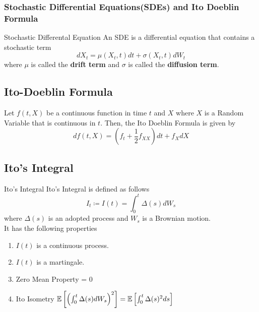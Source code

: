 \begin{frame}
	\frametitle{Stochastic Differential Equations(SDEs) and
	Ito Doeblin Formula}
	\begin{block}{Stochastic Differental Equation}
		An SDE is a differential equation that contains a stochastic term
		\[ dX_t = \mu(X_t, t)dt + \sigma(X_t, t)dW_t \]
		where \( \mu \) is called the \textbf{drift term} and
		\( \sigma \) is called the \textbf{diffusion term}.
	\end{block}

	\subsection{Ito-Doeblin Formula}
	\begin{theorem} \label{thm:ito-doeblin-formula}
		Let \( f(t, X) \) be a continuous function in time \( t \) and \( X \)
		where \( X \) is a Random Variable that is continuous in \( t \).
		Then, the Ito Doeblin Formula is given by
		\[ df(t, X) = \left( f_t + \frac{1}{2}f_{XX} \right) dt + f_{X} dX \]
	\end{theorem}
\end{frame}

\subsection{Ito's Integral}
\begin{frame}{Ito's Integral}
	Ito's Integral is defined as follows
	\[ I_t \coloneqq I(t) = \int_0^t \Delta(s) dW_s \]
	where \( \Delta(s) \) is an adopted process and \( W_s \) is a Brownian
	motion. \\

	It has the following properties
	\begin{enumerate}
		\item \( I(t) \) is a continuous process.
		\item \( I(t) \) is a martingale.
		\item Zero Mean Property  = 0
		\item Ito Isometry \( \mathbb{E} \left[ \left( \int_0^t \Delta(s) dW_s \right)^2 \right]
			= \mathbb{E} \left[ \int_0^t \Delta(s)^2 ds \right]  \)
	\end{enumerate}

\end{frame}
